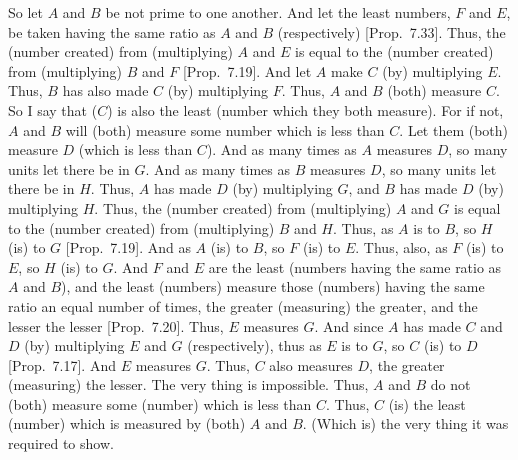 \begin{Parallel}{}{}
{So let $A$ and $B$ be not prime to one another. And let the least numbers,
$F$ and $E$, be taken having the same ratio as $A$ and $B$ (respectively)
[Prop.~7.33]. Thus, the (number created)
from (multiplying) $A$ and $E$ is equal to the (number created) from (multiplying) $B$ and $F$ [Prop.~7.19].
And let $A$ make $C$ (by) multiplying $E$. Thus, $B$ has also made $C$
(by) multiplying $F$. Thus, $A$ and $B$ (both) measure $C$. So I say that
($C$) is also the least (number which they both measure). For if not, 
$A$ and $B$ will (both) measure some number which is less than $C$. Let them
(both) measure $D$ 
(which is less than $C$). And as many times as $A$ measures $D$, so many units
let there be in $G$.
And as many times as $B$ measures $D$,
so many units let there be in $H$. Thus, $A$ has made $D$ (by) multiplying $G$, and $B$
has made $D$ (by) multiplying $H$. Thus, the (number created) from (multiplying) $A$ and $G$ is equal to the (number created)
from (multiplying) $B$ and $H$. Thus, as $A$ is to $B$, so $H$ (is) to $G$ [Prop.~7.19]. And as $A$ (is) to $B$, so $F$ (is) to $E$.
Thus, also, as $F$ (is) to $E$, so $H$ (is) to $G$. And $F$ and $E$ are the least
(numbers having the same ratio as $A$ and $B$), and the least (numbers) measure
those (numbers) having the same ratio an equal number of times, the
greater (measuring) the greater, and the lesser the lesser [Prop.~7.20]. Thus, $E$ measures $G$. And since $A$
has made $C$ and $D$ (by) multiplying $E$ and $G$ (respectively), thus as
$E$ is to $G$, so $C$ (is) to $D$ [Prop.~7.17].
And $E$ measures $G$. Thus, $C$ also measures $D$, the greater (measuring) the
lesser. The very thing is impossible. Thus, $A$ and $B$ do not (both) measure some (number) which is less than $C$. Thus, $C$ (is) the least (number) which is measured by (both) $A$
and $B$. (Which is) the very thing it was required to show.}
\end{Parallel}

